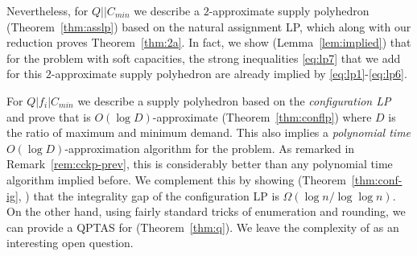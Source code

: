 Nevertheless, for $Q||C_{min}$ we describe a $2$-approximate supply polyhedron (Theorem~\ref{thm:asslp}) based on the natural assignment LP, which along with our reduction proves Theorem~\ref{thm:2a}. In fact, we show (Lemma~\ref{lem:implied}) that for the \mckc problem with soft capacities, the strong  inequalities \eqref{eq:lp7} that we add for this $2$-approximate supply polyhedron are already implied by \eqref{eq:lp1}-\eqref{eq:lp6}.

For $Q|f_i|C_{min}$ we describe a supply polyhedron based on the {\em configuration LP} and prove that is $O(\log D)$-approximate (Theorem~\ref{thm:conflp}) where $D$ is the ratio of maximum and minimum demand. This also implies a {\em polynomial time} $O(\log D)$-approximation algorithm for the \cckp problem. As remarked in Remark~\ref{rem:cckp-prev}, this is considerably better than any polynomial time algorithm implied before. %
We complement this by showing (Theorem~\ref{thm:conf-ig}, ) that the integrality gap of the configuration LP is $\Omega(\log n/\log\log n)$.
On the other hand, using fairly standard tricks of enumeration and rounding, we can provide a QPTAS for \cckp (Theorem~\ref{thm:q}). We leave the complexity of \cckp as an interesting open question.






